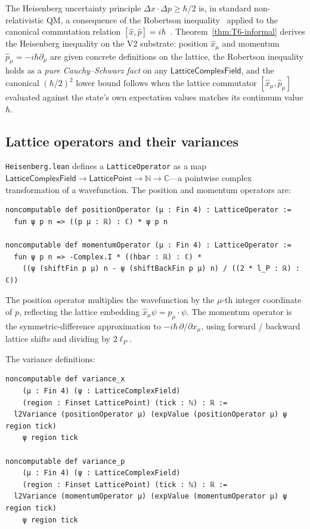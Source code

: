 \documentclass[11pt,a4paper,twoside]{article}
\theoremstyle{definition}
\newcommand{\Cbb}{\mathbb{C}}
\newcommand{\Nbb}{\mathbb{N}}
\newcommand{\lP}{\ell_P}
\newcommand{\xhat}{\hat{x}}
\newcommand{\phat}{\hat{p}}
\newcommand{\Lfield}{\mathsf{LatticeComplexField}}
\newcommand{\code}[1]{\texttt{#1}}
\begin{document}
The Heisenberg uncertainty principle
$\Delta x\cdot\Delta p\ge\hbar/2$ is, in standard non-relativistic QM,
a consequence of the Robertson inequality~\cite{Robertson1929} applied
to the canonical commutation relation
$[\xhat,\phat]=i\hbar$~\cite{Heisenberg1927}.
Theorem~\ref{thm:T6-informal} derives the Heisenberg inequality on
the V2 substrate: position $\xhat_{\mu}$ and momentum
$\phat_{\mu}=-i\hbar\partial_{\mu}$ are given concrete definitions on
the lattice, the Robertson inequality holds as a \emph{pure
Cauchy--Schwarz fact} on any $\Lfield$, and the canonical
$(\hbar/2)^{2}$ lower bound follows when the lattice commutator
$[\xhat_{\mu},\phat_{\mu}]$ evaluated against the state's own
expectation values matches its continuum value $\hbar$.

\subsection{Lattice operators and their
variances}\label{sec:heisenberg-ops}

\code{Heisenberg.lean} defines a \code{LatticeOperator} as a map
$\Lfield\to\mathsf{LatticePoint}\to\Nbb\to\Cbb$---a pointwise complex
transformation of a wavefunction. The position and momentum operators
are:
\begin{lstlisting}
noncomputable def positionOperator (μ : Fin 4) : LatticeOperator :=
  fun ψ p n => ((p μ : ℝ) : ℂ) * ψ p n

noncomputable def momentumOperator (μ : Fin 4) : LatticeOperator :=
  fun ψ p n => -Complex.I * ((hbar : ℝ) : ℂ) *
    ((ψ (shiftFin p μ) n - ψ (shiftBackFin p μ) n) / ((2 * l_P : ℝ) : ℂ))
\end{lstlisting}

The position operator multiplies the wavefunction by the $\mu$-th
integer coordinate of $p$, reflecting the lattice embedding
$\xhat_{\mu}\psi=p_{\mu}\cdot\psi$. The momentum operator is the
symmetric-difference approximation to $-i\hbar\,\partial/\partial x_{\mu}$,
using forward / backward lattice shifts and dividing by $2\lP$.

The variance definitions:
\begin{lstlisting}
noncomputable def variance_x
    (μ : Fin 4) (ψ : LatticeComplexField)
    (region : Finset LatticePoint) (tick : ℕ) : ℝ :=
  l2Variance (positionOperator μ) (expValue (positionOperator μ) ψ region tick)
    ψ region tick

noncomputable def variance_p
    (μ : Fin 4) (ψ : LatticeComplexField)
    (region : Finset LatticePoint) (tick : ℕ) : ℝ :=
  l2Variance (momentumOperator μ) (expValue (momentumOperator μ) ψ region tick)
    ψ region tick
\end{lstlisting}
\end{document}
